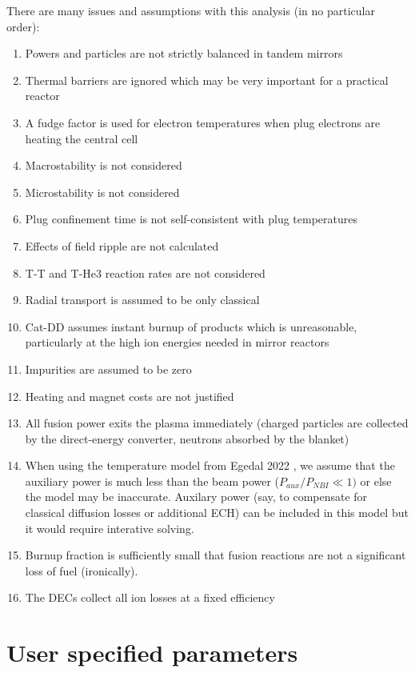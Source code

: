 There are many issues and assumptions with this analysis (in no particular order):
\begin{enumerate}
    \item Powers and particles are not strictly balanced in tandem mirrors
    \item Thermal barriers are ignored which may be very important for a practical reactor
    \item A fudge factor is used for electron temperatures when plug electrons are heating the central cell
    \item Macrostability is not considered
    \item Microstability is not considered
    \item Plug confinement time is not self-consistent with plug temperatures
    \item Effects of field ripple are not calculated
    \item T-T and T-He3 reaction rates are not considered
    \item Radial transport is assumed to be only classical 
    \item Cat-DD assumes instant burnup of products which is unreasonable, particularly at the high ion energies needed in mirror reactors
    \item Impurities are assumed to be zero
    \item Heating and magnet costs are not justified 
    \item All fusion power exits the plasma immediately (charged particles are collected by the direct-energy converter, neutrons absorbed by the blanket)
    \item When using the temperature model from Egedal 2022 \cite{Egedal_2022}, we assume that the auxiliary power is much less than the beam power ($P_{aux} / P_{NBI} \ll 1)$ or else the model may be inaccurate. Auxilary power (say, to compensate for classical diffusion losses or additional ECH) can be included in this model but it would require interative solving.
    \item Burnup fraction is sufficiently small that fusion reactions are not a significant loss of fuel (ironically).
    \item The DECs collect all ion losses at a fixed efficiency
\end{enumerate}

\section{User specified parameters}

